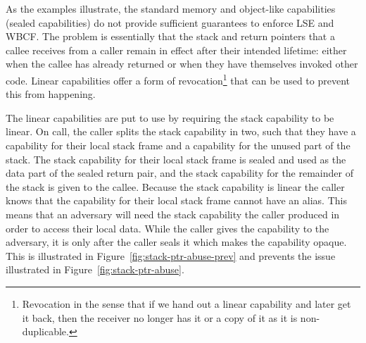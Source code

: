 \documentclass[acmsmall,review,anonymous]{acmart}\settopmatter{printfolios=true,printccs=false,printacmref=false}
\begin{document}
As the examples illustrate, the standard memory and object-like capabilities (sealed capabilities) do not provide sufficient guarantees to enforce LSE and WBCF.
The problem is essentially that the stack and return pointers that a callee receives from a caller remain in effect after their intended lifetime: either when the callee has already returned or when they have themselves invoked other code. 
Linear capabilities offer a form of revocation\footnote{Revocation in the sense that if we hand out a linear capability and later get it back, then the receiver no longer has it or a copy of it as it is non-duplicable.} that can be used to prevent this from happening.

The linear capabilities are put to use by requiring the stack capability to be linear.
On call, the caller splits the stack capability in two, such that they have a capability for their local stack frame and a capability for the unused part of the stack.
The stack capability for their local stack frame is sealed and used as the data part of the sealed return pair, and the stack capability for the remainder of the stack is given to the callee.
Because the stack capability is linear the caller knows that the capability for their local stack frame cannot have an alias.
This means that an adversary will need the stack capability the caller produced in order to access their local data.
While the caller gives the capability to the adversary, it is only after the caller seals it which makes the capability opaque.
This is illustrated in Figure~\ref{fig:stack-ptr-abuse-prev} and prevents the issue illustrated in Figure~\ref{fig:stack-ptr-abuse}.
\end{document}
